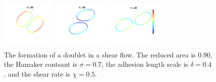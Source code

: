\documentclass[aps,prl,twocolumn,showpacs,amsmath,amssymb]{revtex4-1}
\begin{document}
\begin{figure}[htp]
  \includegraphics[width=0.24\textwidth]{figs/adR4em1adS7em1Chi5em1_ra090_image06.png}
  \includegraphics[width=0.24\textwidth]{figs/adR4em1adS7em1Chi5em1_ra090_image07.png}
  \includegraphics[width=0.24\textwidth]{figs/adR4em1adS7em1Chi5em1_ra090_image08.png}
  \caption{\label{fig:doublet090} The formation of a doublet in a shear
  flow.  The reduced area is $0.90$, the Hamaker contsant is $\sigma=0.7$, the
adhesion length scale is $\delta = 0.4$, and the shear rate is $\chi=0.5$.}
\end{figure}
\end{document}
